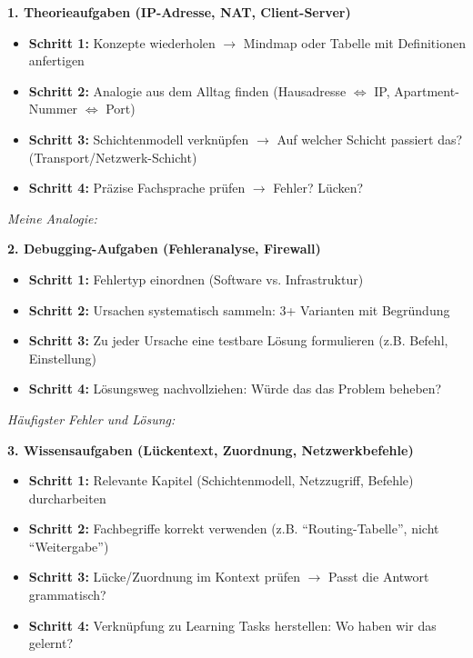 \begin{mainBox}[title=Methodische Anleitung zur Durchführung der Prüfungsaufgaben]

    \small

    \textbf{\large 1. Theorieaufgaben (IP-Adresse, NAT, Client-Server)}
    \begin{itemize}[topsep=2pt, itemsep=2pt]
        \item \textbf{Schritt 1:} Konzepte wiederholen $\rightarrow$ Mindmap oder Tabelle mit Definitionen anfertigen
        \item \textbf{Schritt 2:} Analogie aus dem Alltag finden (Hausadresse $\Leftrightarrow$ IP, Apartment-Nummer $\Leftrightarrow$ Port)
        \item \textbf{Schritt 3:} Schichtenmodell verknüpfen $\rightarrow$ Auf welcher Schicht passiert das? (Transport/Netzwerk-Schicht)
        \item \textbf{Schritt 4:} Präzise Fachsprache prüfen $\rightarrow$ Fehler? Lücken?
    \end{itemize}

    \textit{Meine Analogie:} \underline{\hspace{9cm}}

    \textbf{\large 2. Debugging-Aufgaben (Fehleranalyse, Firewall)}
    \begin{itemize}[topsep=2pt, itemsep=2pt]
        \item \textbf{Schritt 1:} Fehlertyp einordnen (Software vs. Infrastruktur)
        \item \textbf{Schritt 2:} Ursachen systematisch sammeln: 3+ Varianten mit Begründung
        \item \textbf{Schritt 3:} Zu jeder Ursache eine testbare Lösung formulieren (z.B. Befehl, Einstellung)
        \item \textbf{Schritt 4:} Lösungsweg nachvollziehen: Würde das das Problem beheben?
    \end{itemize}

    \textit{Häufigster Fehler und Lösung:} \underline{\hspace{7cm}}

    \textbf{\large 3. Wissensaufgaben (Lückentext, Zuordnung, Netzwerkbefehle)}
    \begin{itemize}[topsep=2pt, itemsep=2pt]
        \item \textbf{Schritt 1:} Relevante Kapitel (Schichtenmodell, Netzzugriff, Befehle) durcharbeiten
        \item \textbf{Schritt 2:} Fachbegriffe korrekt verwenden (z.B. \enquote{Routing-Tabelle}, nicht \enquote{Weitergabe})
        \item \textbf{Schritt 3:} Lücke/Zuordnung im Kontext prüfen $\rightarrow$ Passt die Antwort grammatisch?
        \item \textbf{Schritt 4:} Verknüpfung zu Learning Tasks herstellen: Wo haben wir das gelernt?
    \end{itemize}


\end{mainBox}
